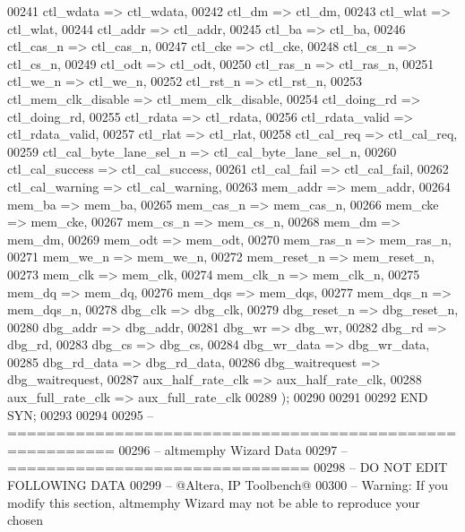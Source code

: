 \begin{DoxyCode}
{00241         ctl\_wdata  =>  ctl_wdata,
00242         ctl\_dm  =>  ctl_dm,
00243         ctl\_wlat  =>  ctl_wlat,
00244         ctl\_addr  =>  ctl_addr,
00245         ctl\_ba  =>  ctl_ba,
00246         ctl\_cas\_n  =>  ctl_cas_n,
00247         ctl\_cke  =>  ctl_cke,
00248         ctl\_cs\_n  =>  ctl_cs_n,
00249         ctl\_odt  =>  ctl_odt,
00250         ctl\_ras\_n  =>  ctl_ras_n,
00251         ctl\_we\_n  =>  ctl_we_n,
00252         ctl\_rst\_n  =>  ctl_rst_n,
00253         ctl\_mem\_clk\_disable  =>  ctl_mem_clk_disable,
00254         ctl\_doing\_rd  =>  ctl_doing_rd,
00255         ctl\_rdata  =>  ctl_rdata,
00256         ctl\_rdata\_valid  =>  ctl_rdata_valid,
00257         ctl\_rlat  =>  ctl_rlat,
00258         ctl\_cal\_req  =>  ctl_cal_req,
00259         ctl\_cal\_byte\_lane\_sel\_n  =>  ctl_cal_byte_lane_sel_n,
00260         ctl\_cal\_success  =>  ctl_cal_success,
00261         ctl\_cal\_fail  =>  ctl_cal_fail,
00262         ctl\_cal\_warning  =>  ctl_cal_warning,
00263         mem\_addr  =>  mem_addr,
00264         mem\_ba  =>  mem_ba,
00265         mem\_cas\_n  =>  mem_cas_n,
00266         mem\_cke  =>  mem_cke,
00267         mem\_cs\_n  =>  mem_cs_n,
00268         mem\_dm  =>  mem_dm,
00269         mem\_odt  =>  mem_odt,
00270         mem\_ras\_n  =>  mem_ras_n,
00271         mem\_we\_n  =>  mem_we_n,
00272         mem\_reset\_n  =>  mem_reset_n,
00273         mem\_clk  =>  mem_clk,
00274         mem\_clk\_n  =>  mem_clk_n,
00275         mem\_dq  =>  mem_dq,
00276         mem\_dqs  =>  mem_dqs,
00277         mem\_dqs\_n  =>  mem_dqs_n,
00278         dbg\_clk  =>  dbg_clk,
00279         dbg\_reset\_n  =>  dbg_reset_n,
00280         dbg\_addr  =>  dbg_addr,
00281         dbg\_wr  =>  dbg_wr,
00282         dbg\_rd  =>  dbg_rd,
00283         dbg\_cs  =>  dbg_cs,
00284         dbg\_wr\_data  =>  dbg_wr_data,
00285         dbg\_rd\_data  =>  dbg_rd_data,
00286         dbg\_waitrequest  =>  dbg_waitrequest,
00287         aux\_half\_rate\_clk  =>  aux_half_rate_clk,
00288         aux\_full\_rate\_clk  =>  aux_full_rate_clk
00289     \textcolor{vhdlchar}{)};
00290 
00291 
00292 \textcolor{keywordflow}{END} \textcolor{vhdlchar}{SYN};
00293 
00294 
00295 \textcolor{keyword}{-- =========================================================}
00296 \textcolor{keyword}{-- altmemphy Wizard Data}
00297 \textcolor{keyword}{-- ===============================}
00298 \textcolor{keyword}{-- DO NOT EDIT FOLLOWING DATA}
00299 \textcolor{keyword}{-- @Altera, IP Toolbench@}
00300 \textcolor{keyword}{-- Warning: If you modify this section, altmemphy Wizard may not be able to reproduce your chosen
}}
\end{DoxyCode}
